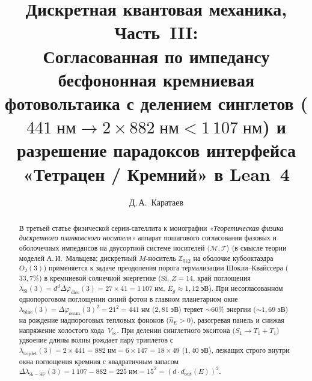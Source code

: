 \documentclass[11pt,a4paper]{article}
\title{\textbf{Дискретная квантовая механика, Часть~III:\\ Согласованная по импедансу бесфононная кремниевая фотовольтаика с делением синглетов ($441\;\text{нм}\to 2\times 882\;\text{нм} < 1\,107\;\text{нм}$) и разрешение парадоксов интерфейса «Тетрацен / Кремний» в Lean~4}}
\author{Д.\,А.~Каратаев}
\date{}
\theoremstyle{plain}
\theoremstyle{definition}
\begin{document}
\maketitle

\begin{abstract}
В третьей статье физической серии-сателлита к монографии \emph{«Теоретическая физика дискретного планковского носителя»} аппарат пошагового согласования фазовых и оболочечных импедансов на двусортной системе носителей $\langle\mathcal{M},\mathcal{T}\rangle$ (в смысле теории моделей А.\,И.~Мальцева; дискретный $M$-носитель $\mathbb{Z}_{512}$ на оболочке кубооктаэдра $O_2(3)$) применяется к задаче преодоления порога термализации Шокли--Квайссера ($33{,}7\%$) в кремниевой солнечной энергетике ($\mathrm{Si}$, $Z=14$, край поглощения $\lambda_{\mathrm{Si}}(3) = d^d\Delta\varphi_{\mathrm{disc}}(3) = 27\times 41 = 1\,107\;\text{нм}$, $E_g\approx 1{,}12\;\text{эВ}$). При несогласованном однопороговом поглощении синий фотон в главном планетарном окне $\lambda_{\mathrm{blue}}(3) = \Delta\varphi_{\mathrm{seam}}(3)^2 = 21^2 = 441\;\text{нм}$ ($2{,}81\;\text{эВ}$) теряет $\sim 60\%$ энергии ($\sim 1{,}69\;\text{эВ}$) на рождение надпороговых тепловых фононов ($\hat{n}_E > 0$), разогревая панель и снижая напряжение холостого хода~$V_{\mathrm{oc}}$. При делении синглетного экситона ($S_1\to T_1 + T_1$) удвоение длины волны рождает пару триплетов с $\lambda_{\mathrm{triplet}}(3) = 2\times 441 = 882\;\text{нм} = 6\times 147 = 18\times 49$ ($1{,}40\;\text{эВ}$), лежащих строго внутри окна поглощения кремния с квадратичным запасом $\Delta\lambda_{\mathrm{Si-SF}}(3) = 1\,107 - 882 = 225\;\text{нм} = 15^2 = (d\cdot d_{\mathrm{out}}(E))^2$.


\end{abstract}
\end{document}
